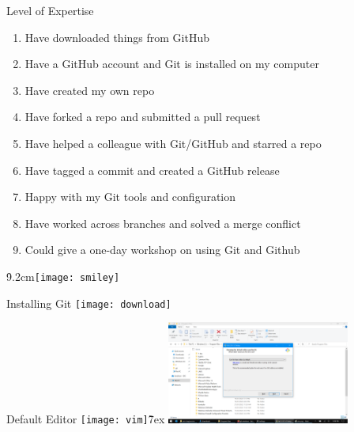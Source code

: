 \documentclass[aspectratio=169]{beamer}
\begin{document}
\begin{frame}{Level of Expertise}\small
  \begin{enumerate}
    \item Have downloaded things from GitHub \\[2ex]
    \item Have a GitHub account and Git is installed on my computer\\[2ex]
    \item Have created my own repo \\[2ex]
    \item Have forked a repo and submitted a pull request \\[2ex]
    \item Have helped a colleague with Git/GitHub and starred a repo\\[2ex]
    \item Have tagged a commit and created a GitHub release\\[2ex]
    \item Happy with my Git tools and configuration \\[2ex]
    \item Have worked across branches and solved a merge conflict\\[2ex]
    \item Could give a one-day workshop on using Git and Github\\[2ex]
  \end{enumerate}
  \vspace{-5ex}
  \h{9.2cm}\texttt{[image: smiley]}
  \vspace{4ex}
\end{frame}


\begin{frame}{Installing Git}
  \texttt{[image: download]}
\end{frame}


\begin{frame}{Default Editor}
  \texttt{[image: vim]}\h{7ex}
  \includegraphics[width=0.45\textwidth]{nano}
\end{frame}
\end{document}
